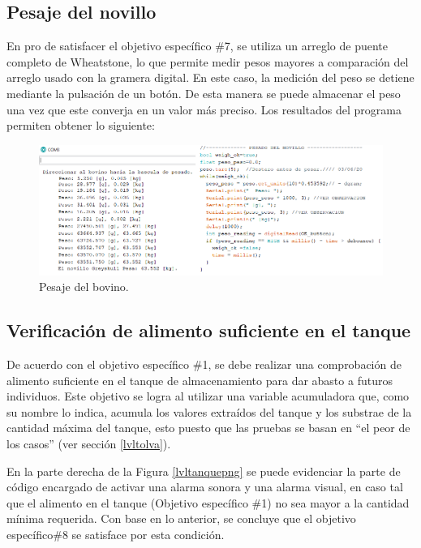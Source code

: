 
\subsection{Pesaje del novillo}

En pro de satisfacer el objetivo específico \#7, se utiliza un arreglo de puente completo de Wheatstone, lo que permite medir pesos mayores a comparación del arreglo usado con la gramera digital. En este caso, la medición del peso se detiene mediante la pulsación de un botón. De esta manera se puede almacenar el peso una vez que este converja en un valor más preciso. Los resultados del programa permiten obtener lo siguiente:

\begin{figure}[H]
	\begin{center}
		\includegraphics[scale=0.57]{img/pesobovino.png}
	\end{center}
	\caption{Pesaje del bovino.}\label{pesobovinopng}
\end{figure}

\subsection{Verificación de alimento suficiente en el tanque}

De acuerdo con el objetivo específico \#1, se debe realizar una comprobación de alimento suficiente en el tanque de almacenamiento para dar abasto a futuros individuos. Este objetivo se logra al utilizar una variable acumuladora que, como su nombre lo indica, acumula los valores extraídos del tanque y los substrae de la cantidad máxima del tanque, esto  puesto que las pruebas se basan en ``el peor de los casos'' (ver sección \ref{lvltolva}).

En la parte derecha de la Figura \ref{lvltanquepng} se puede evidenciar la parte de código encargado de activar una alarma sonora y una alarma visual, en caso tal que el alimento en el tanque (Objetivo específico \#1) no sea mayor a la cantidad mínima requerida. Con base en lo anterior, se concluye que el objetivo específico\#8 se satisface por esta condición.\\

